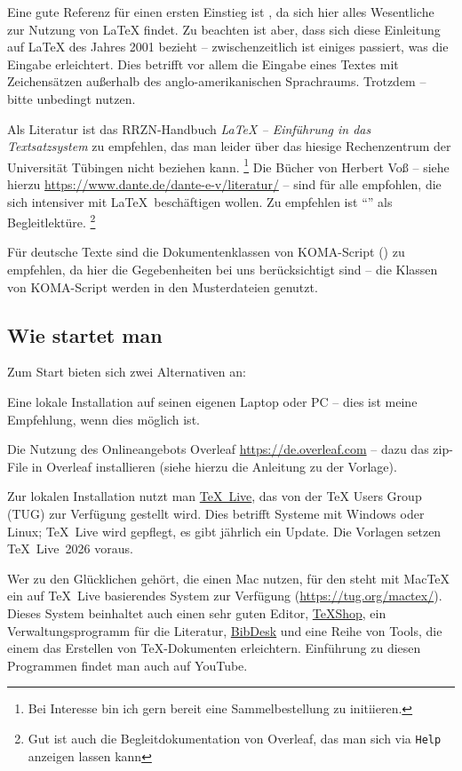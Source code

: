 Eine gute Referenz für einen ersten Einstieg ist \textcite{lshort-german}, da sich hier alles Wesentliche zur Nutzung von \LaTeX{} findet.
Zu beachten ist aber, dass sich diese Einleitung auf \LaTeX{} des Jahres 2001 bezieht -- zwischenzeitlich ist einiges passiert, was die Eingabe erleichtert.
Dies betrifft vor allem die Eingabe eines Textes mit Zeichensätzen außerhalb des anglo-amerikanischen Sprachraums.
Trotzdem -- bitte unbedingt nutzen.

Als Literatur ist das RRZN-Handbuch \emph{\LaTeX{} -- Einführung in das Textsatzsystem} zu empfehlen, das man leider über das hiesige Rechenzentrum der Universität Tübingen nicht beziehen kann.%
\footnote{Bei Interesse bin ich gern bereit eine Sammelbestellung zu initiieren.} 
Die Bücher von Herbert Voß -- siehe hierzu \url{https://www.dante.de/dante-e-v/literatur/} -- sind für alle empfohlen, die sich intensiver mit \LaTeX\ beschäftigen wollen.
Zu empfehlen ist \textcite{voss:2012a} \enquote{} als Begleitlektüre.%
\footnote{Gut ist auch die Begleitdokumentation von Overleaf, das man sich via \texttt{Help} anzeigen lassen kann}

Für deutsche Texte sind die Dokumentenklassen von KOMA-Script (\textcite{kohm:2020}) zu empfehlen, da hier die Gegebenheiten bei uns berücksichtigt sind -- die Klassen von KOMA-Script werden in den Musterdateien genutzt.

\subsection{Wie startet man}
Zum Start bieten sich zwei Alternativen an:
%
\begin{myitemize}[nosep]
	\item 
	Eine lokale Installation auf seinen eigenen Laptop oder PC -- dies ist meine Empfehlung, wenn dies möglich ist.
	
	\item
	Die Nutzung des Onlineangebots Overleaf \url{https://de.overleaf.com} -- dazu das zip-File in Overleaf installieren
	(siehe hierzu die Anleitung zu der Vorlage).
	
\end{myitemize}
%
Zur lokalen Installation nutzt man \href{https://tug.org/texlive/}{\TeX~Live}, das von der \TeX{} Users Group (TUG) zur Verfügung gestellt wird. 
Dies betrifft Systeme mit Windows oder Linux; \TeX~Live wird gepflegt, \dh es gibt jährlich ein Update.
Die Vorlagen setzen \TeX~Live~2026 voraus.

Wer zu den Glücklichen gehört, die einen Mac nutzen, für den steht mit MacTeX ein auf \TeX~Live basierendes System zur Verfügung (\url{https://tug.org/mactex/}).
Dieses System beinhaltet auch einen sehr guten Editor, \href{https://pages.uoregon.edu/koch/texshop/}{TeXShop}, ein Verwaltungsprogramm für die Literatur, \href{https://bibdesk.sourceforge.io}{BibDesk} und eine Reihe von Tools, die einem das Erstellen von \TeX{}-Dokumenten erleichtern.
Einführung zu diesen Programmen findet man auch auf YouTube.

